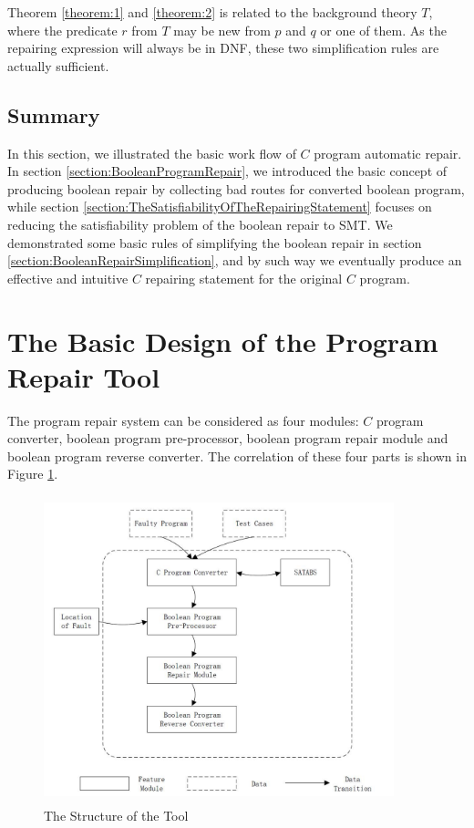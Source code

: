 \documentclass[10pt,journal,final,]{article}
\theoremstyle{definition}
\begin{document}
Theorem \ref{theorem:1} and \ref{theorem:2} is related to the background theory $T$, where the predicate $r$ from $T$ may be new from $p$ and $q$ or one of them.
As the repairing expression will always be in DNF, these two simplification rules are actually sufficient.

\subsection{Summary}
In this section, we illustrated the basic work flow of $C$ program automatic repair. In section \ref{section:BooleanProgramRepair}, we introduced the basic concept of producing boolean repair by collecting bad routes for converted boolean program,
while section \ref{section:TheSatisfiabilityOfTheRepairingStatement} focuses on reducing the satisfiability problem of the boolean repair to SMT. We demonstrated some basic rules of simplifying the boolean repair in section \ref{section:BooleanRepairSimplification}, and by such way we eventually produce an effective and intuitive $C$ repairing statement for the original $C$ program.

\newpage
\section{The Basic Design of the Program Repair Tool}
The program repair system can be considered as four modules: $C$ program converter, boolean program pre-processor, boolean program repair module and boolean program reverse converter.
The correlation of these four parts is shown in Figure \ref{fig:SotT}.

\begin{figure}
\centering
\includegraphics[width=4in,height=3.5in]{Fig4-1.jpg}
\caption{The Structure of the Tool}
\label{fig:SotT}
\end{figure}
\end{document}
